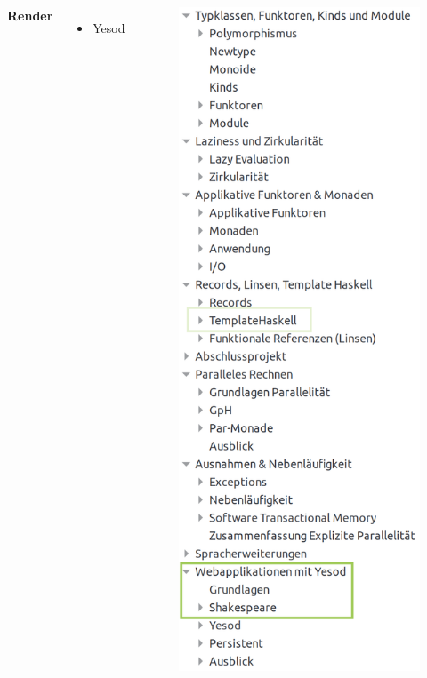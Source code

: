 \documentclass{beamer}
\begin{document}
\begin{frame}

\begin{columns}

{\Large \textbf{Render}}

\begin{itemize}
    \item Yesod
\end{itemize}

\begin{figure}
\includegraphics[height=0.9\paperheight]{cont/ssrender.png}
\end{figure}

\end{columns}

\end{frame}
\end{document}
